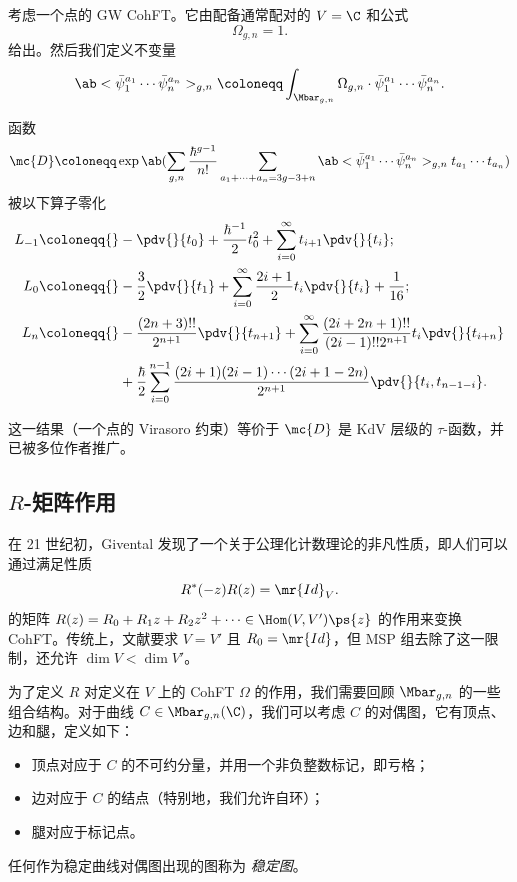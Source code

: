 \begin{exm}
    考虑一个点的 GW CohFT。它由配备通常配对的 $V = \C$ 和公式
    \[ \Omega_{g,n} = 1. \]
    给出。然后我们定义不变量
    \[ \ab<\bar{\psi}_1^{a_1} \cdots \bar{\psi}_n^{a_n}>_{g,n} \coloneqq \int_{\Mbar_{g,n}} \Omega_{g,n} \cdot \bar{\psi}_1^{a_1} \cdots \bar{\psi}_n^{a_n}. \]
    \begin{thm}
        函数
        \[ \mc{D} \coloneqq \exp \ab(\sum_{g,n} \frac{\hbar^{g-1}}{n!}\sum_{a_1 + \cdots + a_n = 3g-3+n} \ab<\bar{\psi}_1^{a_1} \cdots \bar{\psi}_n^{a_n}>_{g,n} t_{a_1}\cdots t_{a_n}) \]
        被以下算子零化
        \begin{align*}
            L_{-1} \coloneqq{}& -\pdv{}{t_0} + \frac{\hbar^{-1}}{2} t_0^2 + \sum_{i=0}^{\infty} t_{i+1} \pdv{}{t_i};\\
            L_0 \coloneqq{}& -\frac{3}{2} \pdv{}{t_1} + \sum_{i=0}^{\infty} \frac{2i+1}{2} t_i \pdv{}{t_i} + \frac{1}{16};\\
            L_n \coloneqq{}& -\frac{(2n+3)!!}{2^{n+1}} \pdv{}{t_{n+1}} + \sum_{i=0}^{\infty} \frac{(2i+2n+1)!!}{(2i-1)!! 2^{n+1}} t_i \pdv{}{t_{i+n}} \\
            &+ \frac{\hbar}{2} \sum_{i=0}^{n-1} \frac{(2i+1) (2i-1) \cdots (2i+1-2n)}{2^{n+1}} \pdv{}{t_i,t_{n-1-i}}.
        \end{align*}
    \end{thm}
\end{exm}

\begin{rmk}
    这一结果（一个点的 Virasoro 约束）等价于 $\mc{D}$ 是 KdV 层级的 $\tau$-函数，并已被多位作者推广。
\end{rmk}



\subsection{$R$-矩阵作用}%
\label{sub:R-matrix action}

在 21 世纪初，Givental 发现了一个关于公理化计数理论的非凡性质，即人们可以通过满足性质
\[ R^*(-z) R(z) = \mr{Id}_V. \]
的矩阵 $R(z) = R_0 + R_1 z + R_2 z^2 + \cdots \in \Hom(V, V')\ps{z}$ 的作用来变换 CohFT。传统上，文献要求 $V = V'$ 且 $R_0 = \mr{Id}$，但 MSP 组去除了这一限制，还允许 $\dim V < \dim V'$。

为了定义 $R$ 对定义在 $V$ 上的 CohFT $\Omega$ 的作用，我们需要回顾 $\Mbar_{g,n}$ 的一些组合结构。对于曲线 $C\in \Mbar_{g,n}(\C)$，我们可以考虑 $C$ 的对偶图，它有顶点、边和腿，定义如下：
\begin{itemize}
    \item 顶点对应于 $C$ 的不可约分量，并用一个非负整数标记，即亏格；
    \item 边对应于 $C$ 的结点（特别地，我们允许自环）；
    \item 腿对应于标记点。
\end{itemize}
任何作为稳定曲线对偶图出现的图称为 \textit{稳定图}。

